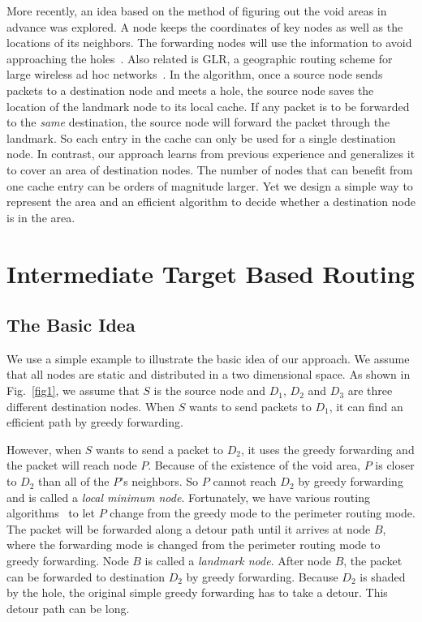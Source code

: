 \documentclass[3p,times]{elsarticle}
\begin{document}
More recently, an idea based on the method of figuring out the void areas
in advance was explored.
A node keeps the coordinates of key nodes as well as the locations of its neighbors.
The forwarding nodes will use the information to avoid approaching the
holes~\cite{ex20,ex21,ex22}.
Also related is GLR,
a geographic routing scheme for large wireless ad hoc networks~\cite{ex26}.
In the algorithm, once a source node sends packets to a destination
node and meets a hole, the source node saves the location of the landmark node
to its local cache. If any packet is to be forwarded to the {\em same} destination,
the source node will forward
the packet through the landmark.
So each entry in the cache can only be used for a single destination node.
In contrast, our approach learns from previous experience and generalizes it to cover an area
of destination nodes. The number of nodes that can benefit from one cache entry can be
orders of magnitude larger.
Yet we design a simple way to represent the area and
an efficient algorithm to decide whether a destination node is in the area.




\section{Intermediate Target Based Routing}
\label{shadedarea}

\subsection{The Basic Idea}


We use a simple example to illustrate the basic idea of our approach.
We assume that all nodes are static and distributed in a two dimensional space.
As shown in Fig.~\ref{fig1}, we assume that
$S$ is the source node and
$D_1$, $D_2$ and $D_3$ are three different destination nodes.
When $S$ wants to send packets to $D_1$, it can find an efficient path by greedy forwarding.

However,
when $S$ wants to send a packet to $D_2$, it uses the greedy forwarding and the packet will reach node $P$.
Because of the existence of the void area, $P$ is closer to $D_2$ than all of the $P$'s neighbors.
So $P$ cannot reach $D_2$ by greedy forwarding and is called a {\em local minimum node}.
Fortunately, we have various routing algorithms~\cite{ex13} to let
$P$ change from the greedy mode to the perimeter routing mode.
The packet will be forwarded along a
detour path until it arrives at node $B$,
where the forwarding mode is changed from the perimeter routing mode
to greedy forwarding.
Node $B$ is called a {\em landmark node}.
After node $B$, the packet can be forwarded to destination $D_2$ by greedy forwarding.
Because $D_2$ is shaded by the hole, the original simple greedy forwarding
has to take a detour. This detour path can be long.
\end{document}
